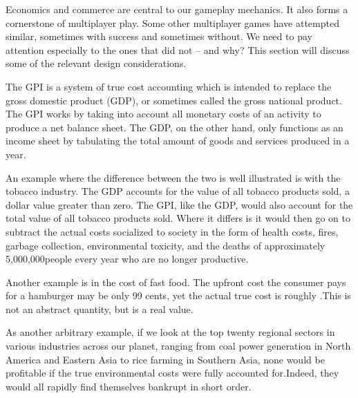 

Economics and commerce are central to our gameplay mechanics. It also forms a cornerstone of multiplayer play. Some other multiplayer games have attempted similar, sometimes with success and sometimes without. We need to pay attention especially to the ones that did not -- and why? This section will discuss some of the relevant design considerations.

The GPI is a system of true cost accounting which is intended to replace the gross domestic product (GDP), or sometimes called the gross national product. The GPI works by taking into account all monetary costs of an activity to produce a net balance sheet. The GDP, on the other hand, only functions as an income sheet by tabulating the total amount of goods and services produced in a year.\footnotecite[cobb1999]

An example where the difference between the two is well illustrated is with the tobacco industry. The GDP accounts for the value of all tobacco products sold, a dollar value greater than zero. The GPI, like the GDP, would also account for the total value of all tobacco products sold. Where it differs is it would then go on to subtract the actual costs socialized to society in the form of health costs, fires, garbage collection, environmental toxicity, and the deaths of approximately 5,000,000 people every year who are no longer productive. 

Another example is in the cost of fast food. The upfront cost the consumer pays for a hamburger may be only 99 cents, yet the actual true cost is roughly .\footnotecite[extras={ p.~46.}][raj2010] This is not an abstract quantity, but is a real value.

As another arbitrary example, if we look at the top twenty regional sectors in various industries across our planet, ranging from coal power generation in North America and Eastern Asia to rice farming in Southern Asia, none would be profitable if the true environmental costs were fully accounted for.\footnotecite[roberts2013] Indeed, they would all rapidly find themselves bankrupt in short order.

